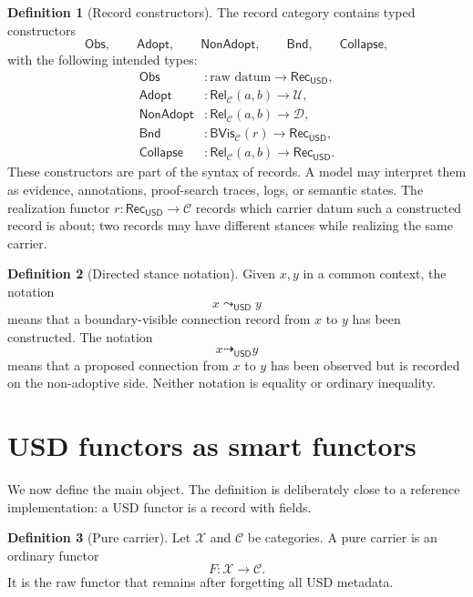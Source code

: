 \documentclass[11pt]{article}
\newcommand{\USD}{\mathsf{USD}}
\newcommand{\RecUSD}{\mathsf{Rec}_{\USD}}
\newcommand{\UFib}{\mathcal U}
\newcommand{\DFib}{\mathcal D}
\newcommand{\Bnd}{\mathsf{Bnd}}
\newcommand{\Rel}{\mathsf{Rel}}
\newcommand{\BVis}{\mathsf{BVis}}
\newcommand{\Obs}{\mathsf{Obs}}
\newcommand{\Adopt}{\mathsf{Adopt}}
\newcommand{\NonAdopt}{\mathsf{NonAdopt}}
\newcommand{\Collapse}{\mathsf{Collapse}}
\newcommand{\uconn}{\mathrel{\leadsto_{\USD}}}
\newcommand{\unadopt}{\mathrel{\dashrightarrow_{\USD}}}
\theoremstyle{definition}
\newtheorem{definition}{Definition}[section]
\theoremstyle{plain}
\begin{document}
\begin{definition}[Record constructors]
The record category contains typed constructors
\[
  \Obs,
  \qquad \Adopt,
  \qquad \NonAdopt,
  \qquad \Bnd,
  \qquad \Collapse,
\]
with the following intended types:
\begin{align*}
  \Obs &: \text{raw datum}\to \RecUSD,\\
  \Adopt &: \Rel_{\mathcal C}(a,b)\to \UFib,\\
  \NonAdopt &: \Rel_{\mathcal C}(a,b)\to \DFib,\\
  \Bnd &: \BVis_{\mathcal C}(r)\to \RecUSD,\\
  \Collapse &: \Rel_{\mathcal C}(a,b)\to \RecUSD.
\end{align*}
These constructors are part of the syntax of records.  A model may
interpret them as evidence, annotations, proof-search traces, logs, or
semantic states.  The realization functor $r:\RecUSD\to\mathcal C$
records which carrier datum such a constructed record is about; two
records may have different stances while realizing the same carrier.
\end{definition}

\begin{definition}[Directed stance notation]
Given $x,y$ in a common context, the notation
\[
  x\uconn y
\]
means that a boundary-visible connection record from $x$ to $y$ has been
constructed.  The notation
\[
  x\unadopt y
\]
means that a proposed connection from $x$ to $y$ has been observed but is
recorded on the non-adoptive side.  Neither notation is equality or
ordinary inequality.
\end{definition}

\section{USD functors as smart functors}

We now define the main object.  The definition is deliberately close to a
reference implementation: a USD functor is a record with fields.

\begin{definition}[Pure carrier]
Let $\mathcal X$ and $\mathcal C$ be categories.  A pure carrier is an
ordinary functor
\[
  F:\mathcal X\to\mathcal C.
\]
It is the raw functor that remains after forgetting all USD metadata.
\end{definition}
\end{document}
